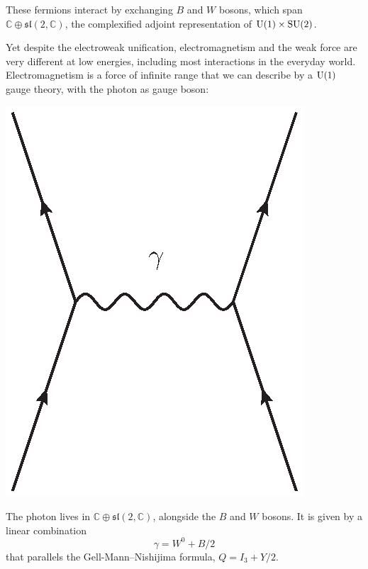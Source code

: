 \documentclass{article}
\newcommand{\C}{{\mathbb C}}  %
\newcommand{\U}{{\rm U}}    %
\newcommand{\SU}{{\rm SU}}    %
\renewcommand{\sl}{\mathfrak{sl}} %
\begin{document}
These fermions interact by exchanging $B$ and $W$ bosons, which span $\C
\oplus \sl(2, \C)$, the complexified adjoint representation of $\U(1) \times
\SU(2)$.  

Yet despite the electroweak unification, electromagnetism and the weak force
are very different at low energies, including most interactions in the everyday
world. Electromagnetism is a force of infinite range that we can describe by a
$\U(1)$ gauge theory, with the photon as gauge boson:
\begin{center}
	\includegraphics[scale=0.6]{photon_exchange}
\end{center}
The photon lives in $\C \oplus \sl(2, \C)$, alongside the $B$ and $W$ bosons.
It is given by a linear combination
\[ \gamma = W^0 + B/2 \]
that parallels the Gell-Mann--Nishijima formula, $Q = I_3 + Y/2$.
\end{document}
